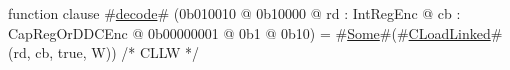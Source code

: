function clause #\hyperref[sailMIPSzdecode]{decode}# (0b010010 @ 0b10000 @ rd : IntRegEnc @ cb : CapRegOrDDCEnc @ 0b00000001 @ 0b1 @ 0b10) = #\hyperref[sailMIPSzSome]{Some}#(#\hyperref[sailMIPSzCLoadLinked]{CLoadLinked}#(rd, cb, true,  W)) /* CLLW  */
